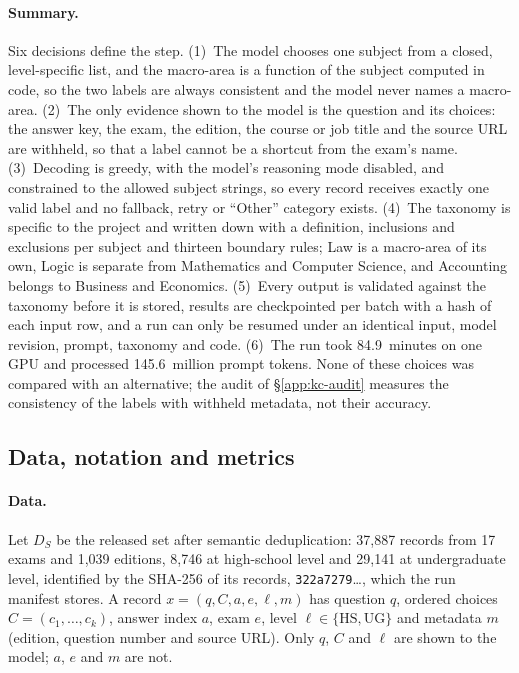 \paragraph{Summary.} Six decisions define the step. (1)~The model chooses
one subject from a closed, level-specific list, and the macro-area is a
function of the subject computed in code, so the two labels are always
consistent and the model never names a macro-area. (2)~The only evidence
shown to the model is the question and its choices: the answer key, the
exam, the edition, the course or job title and the source URL are withheld,
so that a label cannot be a shortcut from the exam's name. (3)~Decoding is
greedy, with the model's reasoning mode disabled, and constrained to the
allowed subject strings, so every record receives exactly one valid label and
no fallback, retry or ``Other'' category exists. (4)~The taxonomy is specific
to the project and written down with a definition, inclusions and exclusions
per subject and thirteen boundary rules; Law is a macro-area of its own,
Logic is separate from Mathematics and Computer Science, and Accounting
belongs to Business and Economics. (5)~Every output is validated against the
taxonomy before it is stored, results are checkpointed per batch with a hash
of each input row, and a run can only be resumed under an identical input,
model revision, prompt, taxonomy and code. (6)~The run took 84.9~minutes on
one GPU and processed 145.6~million prompt tokens. None of these choices was
compared with an alternative; the audit of \S\ref{app:kc-audit} measures the
consistency of the labels with withheld metadata, not their accuracy.

\subsection{Data, notation and metrics}
\label{app:kc-setup}

\paragraph{Data.} Let $D_S$ be the released set after semantic
deduplication: 37,887 records from 17 exams and 1,039 editions, 8,746 at
high-school level and 29,141 at undergraduate level, identified by the
SHA-256 of its records, \texttt{322a7279}\ldots, which the run manifest
stores. A record $x=(q,C,a,e,\ell,m)$ has question $q$, ordered choices
$C=(c_1,\dots,c_k)$, answer index $a$, exam $e$, level
$\ell\in\{\mathrm{HS},\mathrm{UG}\}$ and metadata $m$ (edition, question
number and source URL). Only $q$, $C$ and $\ell$ are shown to the model; $a$,
$e$ and $m$ are not.

